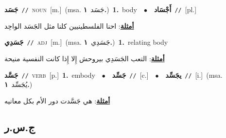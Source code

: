 \documentclass[10pt,a4paper,twoside]{article} %
\begin{document}
\begin{multicols}{2}
{\setlength\topsep{0pt}\textbf{\foreignlanguage{arabic}{جَسَد}}\ {\color{gray}\texttt{//}\color{black}}\ \textsc{noun}\ [m.]\ \color{gray}(msa. \foreignlanguage{arabic}{جَسَد}~\foreignlanguage{arabic}{\textbf{١.}})\color{black}\ \textbf{1.}~body\ \ $\bullet$\ \ \setlength\topsep{0pt}\textbf{\foreignlanguage{arabic}{أَجْسَاد}}\ {\color{gray}\texttt{//}\color{black}}\ [pl.]\  \begin{flushright}\color{gray}\foreignlanguage{arabic}{\textbf{\underline{\foreignlanguage{arabic}{أمثلة}}}: احنا الفلسطينيين كلنا مثل الجَسَد الواحِد}\end{flushright}\color{black}} \vspace{2mm}

{\setlength\topsep{0pt}\textbf{\foreignlanguage{arabic}{جَسَدِي}}\ {\color{gray}\texttt{//}\color{black}}\ \textsc{adj}\ [m.]\ \color{gray}(msa. \foreignlanguage{arabic}{جَسَدِي}~\foreignlanguage{arabic}{\textbf{١.}})\color{black}\ \textbf{1.}~relating body\  \begin{flushright}\color{gray}\foreignlanguage{arabic}{\textbf{\underline{\foreignlanguage{arabic}{أمثلة}}}: التعب الجَسَدِي بيروحش إِلا إِذا كانت النفسية منيحة}\end{flushright}\color{black}} \vspace{2mm}

{\setlength\topsep{0pt}\textbf{\foreignlanguage{arabic}{جَسَّد}}\ {\color{gray}\texttt{//}\color{black}}\ \textsc{verb}\ [p.]\ \textbf{1.}~embody\ \ $\bullet$\ \ \setlength\topsep{0pt}\textbf{\foreignlanguage{arabic}{جَسِّد}}\ {\color{gray}\texttt{//}\color{black}}\ [c.]\ \ $\bullet$\ \ \setlength\topsep{0pt}\textbf{\foreignlanguage{arabic}{يجَسِّد}}\ {\color{gray}\texttt{//}\color{black}}\ [i.]\ \color{gray}(msa. \foreignlanguage{arabic}{يُجَسِّد}~\foreignlanguage{arabic}{\textbf{١.}})\color{black}\  \begin{flushright}\color{gray}\foreignlanguage{arabic}{\textbf{\underline{\foreignlanguage{arabic}{أمثلة}}}: هي جَسَّدت دور الأم بكل معانيه}\end{flushright}\color{black}} \vspace{2mm}

\vspace{-3mm}
\subsection*{\color{blue}\foreignlanguage{arabic}{ج.س.ر}\color{blue}{}} 


\end{multicols}
\end{document}
